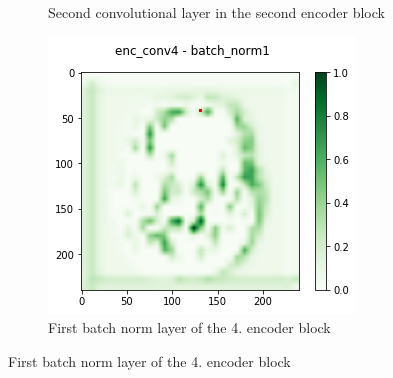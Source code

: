 \begin{figure}[H]
\begin{subfigure}{.32\textwidth}
        \caption{Second convolutional layer in the second encoder block}
    \end{subfigure}\hfill%
    \begin{subfigure}{.32\textwidth}
        \centering
        \includegraphics[width=\linewidth]{chapters/04_segmentation/images/grad_cam_14.png}
        \caption{First batch norm layer of the 4. encoder block}
    \end{subfigure}


\end{figure}
